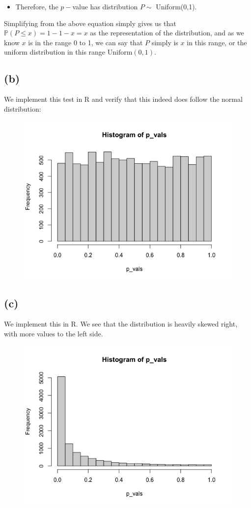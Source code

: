 \documentclass{article}
\begin{document}
{%
\begin{itemize}
  \item Therefore, the $p-$value has distribution $P \sim$ Uniform(0,1).
\end{itemize}
Simplifying from the above equation simply gives us that $\mathbb{P}(P \leq x) = 1 - 1 - x = x$ as the representation of the distribution, and as we know $x$ is in the range 0 to 1, we can say that $P$ simply is $x$ in this range, or the uniform distribution in this range $\text{Uniform}(0,1)$.

\subsection*{(b)}

We implement this test in R and verify that this indeed does follow the normal distribution: 
\begin{figure}[h!]
  \centering
  \includegraphics[width=325pt]{hw7_2b.png}
\end{figure}

\subsection*{(c)}

We implement this in R. We see that the distribution is heavily skewed right, with more values to the left side.
\begin{figure}[h!]
  \centering
  \includegraphics[width=325pt]{hw7_2c.png}
\end{figure}

}
\end{document}
